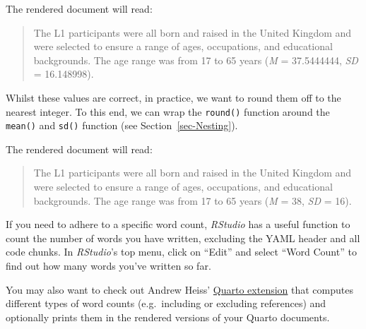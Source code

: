 \documentclass[
  letterpaper,
  DIV=11,
  numbers=noendperiod]{scrreprt}
\newenvironment{Shaded}{\begin{snugshade}}{\end{snugshade}}
\newcommand{\InformationTok}[1]{\textcolor[rgb]{0.37,0.37,0.37}{#1}}
\newcommand{\NormalTok}[1]{\textcolor[rgb]{0.00,0.23,0.31}{#1}}
\begin{document}
The rendered document will read:

\begin{quote}
The L1 participants were all born and raised in the United Kingdom and
were selected to ensure a range of ages, occupations, and educational
backgrounds. The age range was from 17 to 65 years (\emph{M} =
37.5444444, \emph{SD} = 16.148998).
\end{quote}

Whilst these values are correct, in practice, we want to round them off
to the nearest integer. To this end, we can wrap the \texttt{round()}
function around the \texttt{mean()} and \texttt{sd()} function (see
Section~\ref{sec-Nesting}).

\begin{Shaded}
\end{Shaded}

The rendered document will read:

\begin{quote}
The L1 participants were all born and raised in the United Kingdom and
were selected to ensure a range of ages, occupations, and educational
backgrounds. The age range was from 17 to 65 years (\emph{M} = 38,
\emph{SD} = 16).
\end{quote}

\begin{tcolorbox}[enhanced jigsaw, arc=.35mm, bottomrule=.15mm, bottomtitle=1mm, breakable, colback=white, colbacktitle=quarto-callout-note-color!10!white, colframe=quarto-callout-note-color-frame, coltitle=black, left=2mm, leftrule=.75mm, opacityback=0, opacitybacktitle=0.6, rightrule=.15mm, title=\textcolor{quarto-callout-note-color}{\faInfo}\hspace{0.5em}{Making the word count!~\emoji{dart}}, titlerule=0mm, toprule=.15mm, toptitle=1mm]

If you need to adhere to a specific word count, \emph{RStudio} has a
useful function to count the number of words you have written, excluding
the YAML header and all code chunks. In \emph{RStudio}'s top menu, click
on ``Edit'' and select ``Word Count'' to find out how many words you've
written so far.

You may also want to check out Andrew Heiss'
\href{https://github.com/andrewheiss/quarto-wordcount}{Quarto extension}
that computes different types of word counts (e.g.~including or
excluding references) and optionally prints them in the rendered
versions of your Quarto documents.

\end{tcolorbox}
\end{document}
